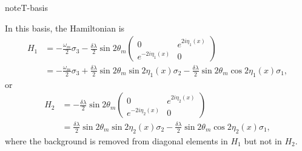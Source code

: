 \documentclass[letterpaper,12pt,english]{sphinxmanual}
\begin{document}
\begin{sphinxadmonition}{note}{T-basis}

In this basis, the Hamiltonian is
\begin{equation*}
\begin{split}H_1 &= -\frac{\omega_m}{2} \sigma_3 - \frac{\delta \lambda}{2} \sin 2\theta_m \begin{pmatrix}
0 & e^{2i\eta_1(x)} \\
e^{-2i\eta_1(x)} & 0
\end{pmatrix} \\
& = -\frac{\omega_m}{2} \sigma_3 +\frac{\delta \lambda}{2} \sin 2\theta_m \sin 2\eta_1(x) \sigma_2  - \frac{\delta \lambda}{2} \sin 2\theta_m \cos 2\eta_1(x) \sigma_1,\end{split}
\end{equation*}
or
\begin{equation*}
\begin{split}H_2 &= - \frac{\delta \lambda}{2} \sin 2\theta_m \begin{pmatrix}
0 & e^{2i\eta_2(x)} \\
e^{-2i\eta_2(x)} & 0
\end{pmatrix} \\
&= \frac{\delta \lambda}{2} \sin 2\theta_m \sin 2\eta_2(x) \sigma_2  - \frac{\delta \lambda}{2} \sin 2\theta_m \cos 2\eta_2(x) \sigma_1,\end{split}
\end{equation*}
where the background is removed from diagonal elements in \(H_1\) but not in \(H_2\).


\end{sphinxadmonition}
\end{document}
